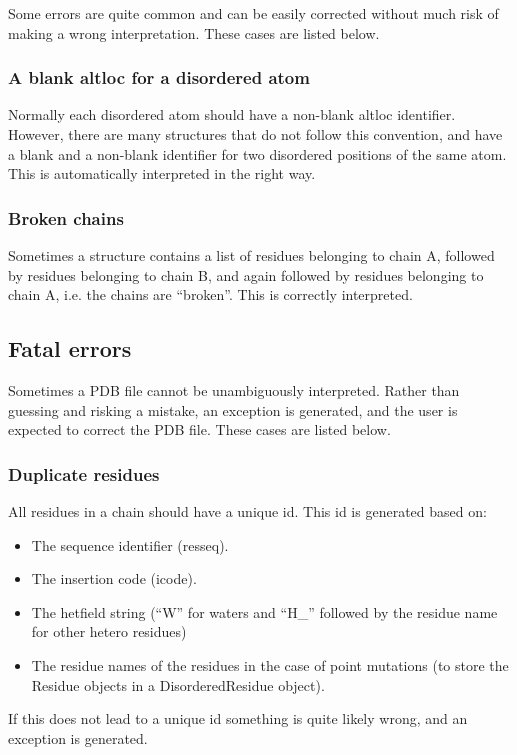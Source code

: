 Some errors are quite common and can be easily corrected without much risk of
making a wrong interpretation. These cases are listed below.

\subsubsection{A blank altloc for a disordered atom}

Normally each disordered atom should have a non-blank altloc identifier. However,
there are many structures that do not follow this convention, and have a blank
and a non-blank identifier for two disordered positions of the same atom. This
is automatically interpreted in the right way.

\subsubsection{Broken chains}

Sometimes a structure contains a list of residues belonging to chain A, followed
by residues belonging to chain B, and again followed by residues belonging to
chain A, i.e. the chains are ``broken''. This is correctly interpreted.

\subsection{Fatal errors}

Sometimes a PDB file cannot be unambiguously interpreted. Rather than guessing
and risking a mistake, an exception is generated, and the user is expected to
correct the PDB file. These cases are listed below.

\subsubsection{Duplicate residues}

All residues in a chain should have a unique id. This id is generated based
on:

\begin{itemize}
\item The sequence identifier (resseq).
\item The insertion code (icode).
\item The hetfield string (``W'' for waters and ``H\_'' followed by the
residue name for other hetero residues)
\item The residue names of the residues in the case of point mutations (to store the
Residue objects in a DisorderedResidue object).
\end{itemize}
If this does not lead to a unique id something is quite likely wrong, and an
exception is generated.

